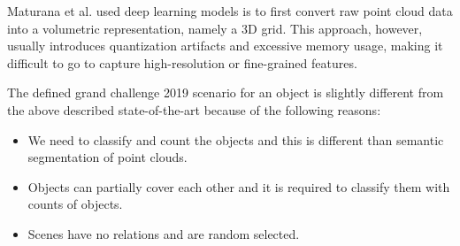 Maturana et al. \cite{DBLP:conf/iros/MaturanaS15} used deep learning models is to first convert raw point cloud data into a 
volumetric representation, namely a 3D grid. This approach, however, usually introduces quantization artifacts and excessive memory usage, making it difficult to go to capture high-resolution or fine-grained features.


The defined grand challenge 2019 \cite{DEBSGC2019} scenario for an object is slightly different from
the above described state-of-the-art because of the following reasons: 
\begin{itemize}
  \item We need to classify and count the objects and this is different than semantic segmentation
  of point clouds. 
  \item Objects can partially cover each other and it is required to classify them with counts of
  objects. 
  \item Scenes have no relations and are random selected.  
\end{itemize}









